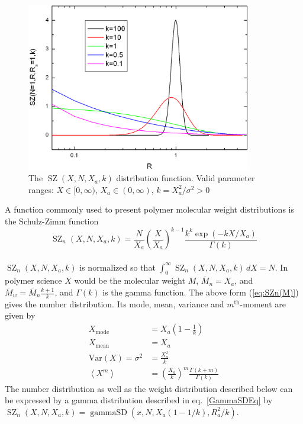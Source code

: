 \begin{figure}[htb]
\begin{center}
\includegraphics[width=0.876\textwidth]{SZ.png}
\end{center}
\caption{The $\operatorname{SZ}(X,N,X_a,k)$ distribution function. Valid
parameter ranges: $X \in [0,\infty)$, $X_a \in (0,\infty)$,
$k=X_a^2/\sigma^2 > 0$} \label{fig:SchulzZimm}
\end{figure}

A function commonly used to present polymer molecular weight distributions is the Schulz-Zimm function \cite{Zimm1948}
\begin{equation}
\operatorname{SZ}_n(X,N,X_a,k) =  \frac{N}{X_a}
\left(\frac{X}{X_a}\right)^{k-1}
\frac{k^k\exp(-kX/X_a)}{\Gamma(k)}
\label{eq:SZn(M)}
\end{equation}
~\\
$\operatorname{SZ}_n(X,N,X_a,k)$ is normalized so that $\int_0^\infty\!
\operatorname{SZ}_n(X,N,X_a,k)\,dX = N$.
In polymer science $X$ would be the molecular weight $M$,
$\overline{M}_n=X_a$, and $\overline{M}_w=\overline{M}_n\frac{k+1}{k}$,
and $\Gamma(k)$ is the gamma function.
The above form (\ref{eq:SZn(M)}) gives the number distribution.
Its mode, mean, variance and $m^\textrm{th}$-moment are given by
\begin{subequations}
\begin{align}
X_\textrm{mode} &= X_a \left(1-\frac{1}{k}\right)\\
X_\textrm{mean} &= X_a \\
\textrm{Var}\left(X\right)=\sigma^2 &= \frac{X_a^2}{k} \\
\left\langle X^m \right\rangle &=
\left(\frac{X_a}{k}\right)^m  \frac{\Gamma \left(k+m\right)}{\Gamma (k)}
\label{eq:SZstatparam}
\end{align}
\end{subequations}
The number distribution as well as the weight distribution described below can be expressed by a gamma distribution described in eq.\ \ref{GammaSDEq} by $\operatorname{SZ}_n(X,N,X_a,k)=\operatorname{gammaSD}(x,N,X_a(1-1/k),R_a^2/k)$.

